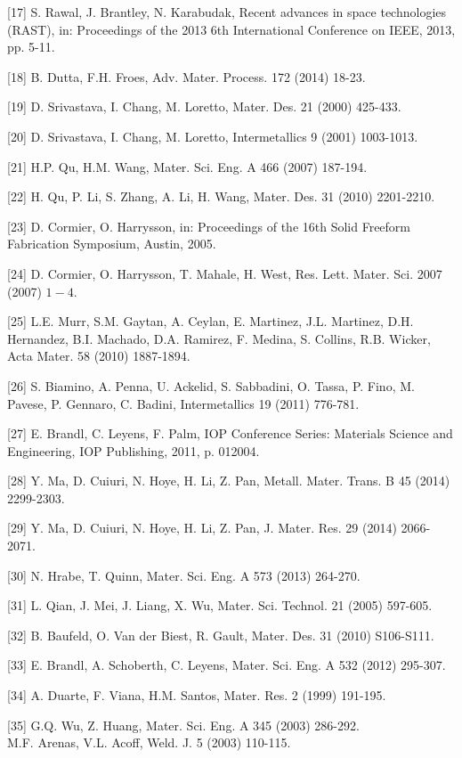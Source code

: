 \documentclass[10pt]{article}
\begin{document}
[17] S. Rawal, J. Brantley, N. Karabudak, Recent advances in space technologies (RAST), in: Proceedings of the 2013 6th International Conference on IEEE, 2013, pp. 5-11.

[18] B. Dutta, F.H. Froes, Adv. Mater. Process. 172 (2014) 18-23.

[19] D. Srivastava, I. Chang, M. Loretto, Mater. Des. 21 (2000) 425-433.

[20] D. Srivastava, I. Chang, M. Loretto, Intermetallics 9 (2001) 1003-1013.

[21] H.P. Qu, H.M. Wang, Mater. Sci. Eng. A 466 (2007) 187-194.

[22] H. Qu, P. Li, S. Zhang, A. Li, H. Wang, Mater. Des. 31 (2010) 2201-2210.

[23] D. Cormier, O. Harrysson, in: Proceedings of the 16th Solid Freeform Fabrication Symposium, Austin, 2005.

[24] D. Cormier, O. Harrysson, T. Mahale, H. West, Res. Lett. Mater. Sci. 2007 (2007) $1-4$.

[25] L.E. Murr, S.M. Gaytan, A. Ceylan, E. Martinez, J.L. Martinez, D.H. Hernandez, B.I. Machado, D.A. Ramirez, F. Medina, S. Collins, R.B. Wicker, Acta Mater. 58 (2010) 1887-1894.

[26] S. Biamino, A. Penna, U. Ackelid, S. Sabbadini, O. Tassa, P. Fino, M. Pavese, P. Gennaro, C. Badini, Intermetallics 19 (2011) 776-781.

[27] E. Brandl, C. Leyens, F. Palm, IOP Conference Series: Materials Science and Engineering, IOP Publishing, 2011, p. 012004.

[28] Y. Ma, D. Cuiuri, N. Hoye, H. Li, Z. Pan, Metall. Mater. Trans. B 45 (2014) 2299-2303.

[29] Y. Ma, D. Cuiuri, N. Hoye, H. Li, Z. Pan, J. Mater. Res. 29 (2014) 2066-2071.

[30] N. Hrabe, T. Quinn, Mater. Sci. Eng. A 573 (2013) 264-270.

[31] L. Qian, J. Mei, J. Liang, X. Wu, Mater. Sci. Technol. 21 (2005) 597-605.

[32] B. Baufeld, O. Van der Biest, R. Gault, Mater. Des. 31 (2010) S106-S111.

[33] E. Brandl, A. Schoberth, C. Leyens, Mater. Sci. Eng. A 532 (2012) 295-307.

[34] A. Duarte, F. Viana, H.M. Santos, Mater. Res. 2 (1999) 191-195.

[35] G.Q. Wu, Z. Huang, Mater. Sci. Eng. A 345 (2003) 286-292.\\
[36] M.F. Arenas, V.L. Acoff, Weld. J. 5 (2003) 110-115.
\end{document}
